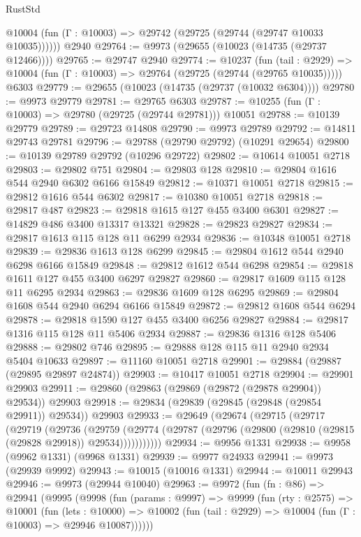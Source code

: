\begin{lexlean}{RustStd}
\begin{coremodule}
      @10004 (fun (Γ : @10003) => @29742 (@29725 (@29744 (@29747 @10033 @10035))))))
    @2940
@29764 := @9973 (@29655 (@10023 (@14735 (@29737 @12466))))
@29765 := @29747 @2940
@29774 := @10237
    (fun (tail : @2929) => @10004 (fun (Γ : @10003) => @29764 (@29725 (@29744 (@29765 @10035)))))
    @6303
@29779 := @29655 (@10023 (@14735 (@29737 (@10032 @6304))))
@29780 := @9973 @29779
@29781 := @29765 @6303
@29787 := @10255 (fun (Γ : @10003) => @29780 (@29725 (@29744 @29781))) @10051
@29788 := @10139 @29779
@29789 := @29723 @14808
@29790 := @9973 @29789
@29792 := @14811 @29743 @29781
@29796 := @29788 (@29790 @29792) (@10291 @29654)
@29800 := @10139 @29789 @29792 (@10296 @29722)
@29802 := @10614 @10051 @2718
@29803 := @29802 @751
@29804 := @29803 @128
@29810 := @29804 @1616 @544 @2940 @6302 @6166 @15849
@29812 := @10371 @10051 @2718
@29815 := @29812 @1616 @544 @6302
@29817 := @10380 @10051 @2718
@29818 := @29817 @487
@29823 := @29818 @1615 @127 @455 @3400 @6301
@29827 := @14829 @486 @3400 @13317 @13321
@29828 := @29823 @29827
@29834 := @29817 @1613 @115 @128 @11 @6299 @2934
@29836 := @10348 @10051 @2718
@29839 := @29836 @1613 @128 @6299
@29845 := @29804 @1612 @544 @2940 @6298 @6166 @15849
@29848 := @29812 @1612 @544 @6298
@29854 := @29818 @1611 @127 @455 @3400 @6297 @29827
@29860 := @29817 @1609 @115 @128 @11 @6295 @2934
@29863 := @29836 @1609 @128 @6295
@29869 := @29804 @1608 @544 @2940 @6294 @6166 @15849
@29872 := @29812 @1608 @544 @6294
@29878 := @29818 @1590 @127 @455 @3400 @6256 @29827
@29884 := @29817 @1316 @115 @128 @11 @5406 @2934
@29887 := @29836 @1316 @128 @5406
@29888 := @29802 @746
@29895 := @29888 @128 @115 @11 @2940 @2934 @5404 @10633
@29897 := @11160 @10051 @2718
@29901 := @29884 (@29887 (@29895 @29897 @24874))
@29903 := @10417 @10051 @2718
@29904 := @29901 @29903
@29911 := @29860 (@29863 (@29869 (@29872 (@29878 @29904)) @29534)) @29903
@29918 := @29834 (@29839 (@29845 (@29848 (@29854 @29911)) @29534)) @29903
@29933 := @29649
    (@29674
      (@29715
        (@29717
          (@29719
            (@29736
              (@29759
                (@29774 (@29787 (@29796 (@29800 (@29810 (@29815 (@29828 @29918)) @29534)))))))))))
@29934 := @9956 @1331
@29938 := @9958 (@9962 @1331) (@9968 @1331)
@29939 := @9977 @24933
@29941 := @9973 (@29939 @9992)
@29943 := @10015 (@10016 @1331)
@29944 := @10011 @29943
@29946 := @9973 (@29944 @10040)
@29963 := @9972
    (fun (fn : @86) =>
    @29941
      (@9995
        (@9998
          (fun (params : @9997) =>
          @9999
            (fun (rty : @2575) =>
            @10001
              (fun (lets : @10000) =>
              @10002 (fun (tail : @2929) => @10004 (fun (Γ : @10003) => @29946 @10087))))))

\end{coremodule}
\end{lexlean}
